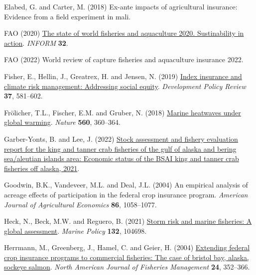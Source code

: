 \documentclass[
  letterpaper,
  DIV=11,
  numbers=noendperiod]{scrartcl}
\newlength{\cslhangindent}
\newlength{\cslentryspacingunit} %
\newenvironment{CSLReferences}[2] %
 {%
  \setlength{\parindent}{0pt}
  \ifodd #1
  \let\oldpar\par
  \def\par{\hangindent=\cslhangindent\oldpar}
  \fi
  \setlength{\parskip}{#2\cslentryspacingunit}
 }%
 {}
\theoremstyle{plain}
\theoremstyle{plain}
\theoremstyle{remark}
\begin{document}
\begin{CSLReferences}{1}{0}
\leavevmode{}%
Elabed, G. and Carter, M. (2018) Ex-ante impacts of agricultural
insurance: Evidence from a field experiment in mali.

\leavevmode{}%
FAO (2020) \href{https://doi.org/10.4060/ca9229en}{The state of world
fisheries and aquaculture 2020. Sustinability in action}. \emph{INFORM}
\textbf{32}.

\leavevmode{}%
FAO (2022) World review of capture fisheries and aquaculture insurance
2022.

\leavevmode{}%
Fisher, E., Hellin, J., Greatrex, H. and Jensen, N. (2019)
\href{https://doi.org/10.1111/dpr.12387}{Index insurance and climate
risk management: Addressing social equity}. \emph{Development Policy
Review} \textbf{37}, 581--602.

\leavevmode{}%
Frölicher, T.L., Fischer, E.M. and Gruber, N. (2018)
\href{https://doi.org/10.1038/s41586-018-0383-9}{Marine heatwaves under
global warming}. \emph{Nature} \textbf{560}, 360--364.

\leavevmode{}%
Garber-Yonts, B. and Lee, J. (2022)
\href{http://www.afsc.noaa.gov/refm/Socioeconomics/SAFE/default.php}{Stock
assessment and fishery evaluation report for the king and tanner crab
fisheries of the gulf of alaska and bering sea/aleutian islands area:
Economic status of the BSAI king and tanner crab fisheries off alaska,
2021}.

\leavevmode{}%
Goodwin, B.K., Vandeveer, M.L. and Deal, J.L. (2004) An empirical
analysis of acreage effects of participation in the federal crop
insurance program. \emph{American Journal of Agricultural Economics}
\textbf{86}, 1058--1077.

\leavevmode{}%
Heck, N., Beck, M.W. and Reguero, B. (2021)
\href{https://doi.org/10.1016/j.marpol.2021.104698}{Storm risk and
marine fisheries: A global assessment}. \emph{Marine Policy}
\textbf{132}, 104698.

\leavevmode{}%
Herrmann, M., Greenberg, J., Hamel, C. and Geier, H. (2004)
\href{https://doi.org/10.1577/M02-086.1}{Extending federal crop
insurance programs to commercial fisheries: The case of bristol bay,
alaska, sockeye salmon}. \emph{North American Journal of Fisheries
Management} \textbf{24}, 352--366.


\end{CSLReferences}
\end{document}

